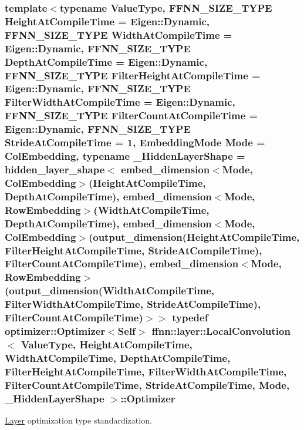 \hypertarget{classffnn_1_1layer_1_1_local_convolution_afb859216bf8b2f6510bbb5606d15773b}{
\subsubsection[{Optimizer}]{\setlength{\rightskip}{0pt plus 5cm}template$<$typename Value\-Type, F\-F\-N\-N\-\_\-\-S\-I\-Z\-E\-\_\-\-T\-Y\-P\-E Height\-At\-Compile\-Time = Eigen\-::\-Dynamic, F\-F\-N\-N\-\_\-\-S\-I\-Z\-E\-\_\-\-T\-Y\-P\-E Width\-At\-Compile\-Time = Eigen\-::\-Dynamic, F\-F\-N\-N\-\_\-\-S\-I\-Z\-E\-\_\-\-T\-Y\-P\-E Depth\-At\-Compile\-Time = Eigen\-::\-Dynamic, F\-F\-N\-N\-\_\-\-S\-I\-Z\-E\-\_\-\-T\-Y\-P\-E Filter\-Height\-At\-Compile\-Time = Eigen\-::\-Dynamic, F\-F\-N\-N\-\_\-\-S\-I\-Z\-E\-\_\-\-T\-Y\-P\-E Filter\-Width\-At\-Compile\-Time = Eigen\-::\-Dynamic, F\-F\-N\-N\-\_\-\-S\-I\-Z\-E\-\_\-\-T\-Y\-P\-E Filter\-Count\-At\-Compile\-Time = Eigen\-::\-Dynamic, F\-F\-N\-N\-\_\-\-S\-I\-Z\-E\-\_\-\-T\-Y\-P\-E Stride\-At\-Compile\-Time = 1, Embedding\-Mode Mode = Col\-Embedding, typename \-\_\-\-Hidden\-Layer\-Shape = hidden\-\_\-layer\-\_\-shape$<$              embed\-\_\-dimension$<$\-Mode, Col\-Embedding$>$(\-Height\-At\-Compile\-Time, Depth\-At\-Compile\-Time),              embed\-\_\-dimension$<$\-Mode, Row\-Embedding$>$(\-Width\-At\-Compile\-Time,  Depth\-At\-Compile\-Time),              embed\-\_\-dimension$<$\-Mode, Col\-Embedding$>$(output\-\_\-dimension(\-Height\-At\-Compile\-Time, Filter\-Height\-At\-Compile\-Time, Stride\-At\-Compile\-Time), Filter\-Count\-At\-Compile\-Time),              embed\-\_\-dimension$<$\-Mode, Row\-Embedding$>$(output\-\_\-dimension(\-Width\-At\-Compile\-Time,  Filter\-Width\-At\-Compile\-Time,  Stride\-At\-Compile\-Time), Filter\-Count\-At\-Compile\-Time)$>$$>$ typedef {\bf optimizer\-::\-Optimizer}$<${\bf Self}$>$ {\bf ffnn\-::layer\-::\-Local\-Convolution}$<$ Value\-Type, Height\-At\-Compile\-Time, Width\-At\-Compile\-Time, Depth\-At\-Compile\-Time, Filter\-Height\-At\-Compile\-Time, Filter\-Width\-At\-Compile\-Time, Filter\-Count\-At\-Compile\-Time, Stride\-At\-Compile\-Time, Mode, \-\_\-\-Hidden\-Layer\-Shape $>$\-::{\bf Optimizer}}}\label{classffnn_1_1layer_1_1_local_convolution_afb859216bf8b2f6510bbb5606d15773b}


\hyperlink{classffnn_1_1layer_1_1_layer}{Layer} optimization type standardization. 

